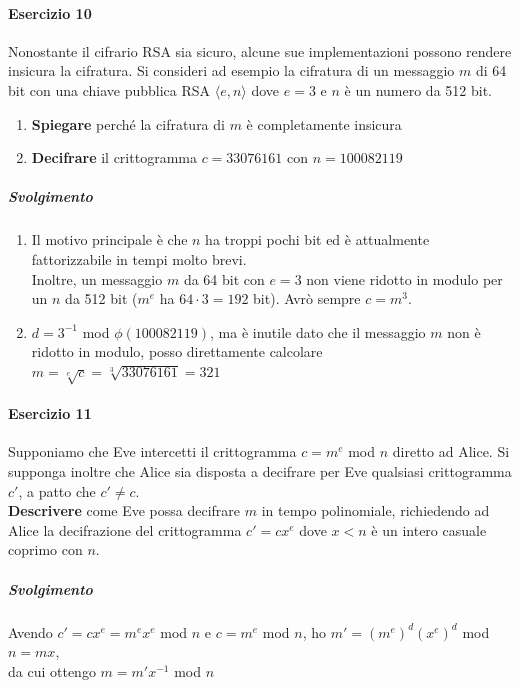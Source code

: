 \documentclass[10pt]{book}
\begin{document}
\paragraph{Esercizio 10} Nonostante il cifrario RSA sia sicuro, alcune sue implementazioni possono rendere insicura la cifratura. Si consideri ad esempio la cifratura di un messaggio $m$ di 64 bit con una chiave pubblica RSA $\langle e,n\rangle$ dove $e=3$ e $n$ è un numero da 512 bit.\begin{enumerate}
	\item \textbf{Spiegare} perché la cifratura di $m$ è completamente insicura
	\item \textbf{Decifrare} il crittogramma $c = 33076161$ con $n = 100082119$
\end{enumerate}
\subparagraph{Svolgimento} \begin{enumerate}
	\item Il motivo principale è che $n$ ha troppi pochi bit ed è attualmente fattorizzabile in tempi molto brevi.\\
	Inoltre, un messaggio $m$ da 64 bit con $e=3$ non viene ridotto in modulo per un $n$ da 512 bit ($m^e$ ha $64\cdot3=192$ bit). Avrò sempre $c = m^3$.
	\item $d = 3^{-1}$ mod $\phi(100082119)$, ma è inutile dato che il messaggio $m$ non è ridotto in modulo, posso direttamente calcolare $m = \sqrt[e]{c} = \sqrt[3]{33076161} = 321$
\end{enumerate}
\paragraph{Esercizio 11} Supponiamo che Eve intercetti il crittogramma $c = m^e$ mod $n$ diretto ad Alice. Si supponga inoltre che Alice sia disposta a decifrare per Eve qualsiasi crittogramma $c'$, a patto che $c'\neq c$.\\
\textbf{Descrivere} come Eve possa decifrare $m$ in tempo polinomiale, richiedendo ad Alice la decifrazione del crittogramma $c' = cx^e$ dove $x<n$ è un intero casuale coprimo con $n$.
\subparagraph{Svolgimento} Avendo $c' = cx^e = m^ex^e$ mod $n$ e $c = m^e$ mod $n$, ho $m' = (m^e)^d(x^e)^d$ mod $n = mx$,\\da cui ottengo $m = m'x^{-1}$ mod $n$
\end{document}
